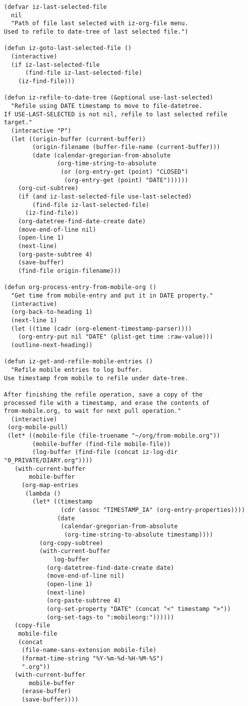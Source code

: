 \documentclass[nofonts]{tufte-handout}
\begin{document}
\begin{verbatim}
(defvar iz-last-selected-file
  nil
  "Path of file last selected with iz-org-file menu.
Used to refile to date-tree of last selected file.")

(defun iz-goto-last-selected-file ()
  (interactive)
  (if iz-last-selected-file
      (find-file iz-last-selected-file)
    (iz-find-file)))

(defun iz-refile-to-date-tree (&optional use-last-selected)
  "Refile using DATE timestamp to move to file-datetree.
If USE-LAST-SELECTED is not nil, refile to last selected refile target."
  (interactive "P")
  (let ((origin-buffer (current-buffer))
        (origin-filename (buffer-file-name (current-buffer)))
        (date (calendar-gregorian-from-absolute
               (org-time-string-to-absolute
                (or (org-entry-get (point) "CLOSED")
                 (org-entry-get (point) "DATE"))))))
    (org-cut-subtree)
    (if (and iz-last-selected-file use-last-selected)
        (find-file iz-last-selected-file)
      (iz-find-file))
    (org-datetree-find-date-create date)
    (move-end-of-line nil)
    (open-line 1)
    (next-line)
    (org-paste-subtree 4)
    (save-buffer)
    (find-file origin-filename)))

(defun org-process-entry-from-mobile-org ()
  "Get time from mobile-entry and put it in DATE property."
  (interactive)
  (org-back-to-heading 1)
  (next-line 1)
  (let ((time (cadr (org-element-timestamp-parser))))
    (org-entry-put nil "DATE" (plist-get time :raw-value)))
  (outline-next-heading))

(defun iz-get-and-refile-mobile-entries ()
  "Refile mobile entries to log buffer.
Use timestamp from mobile to refile under date-tree.

After finishing the refile operation, save a copy of the
processed file with a timestamp, and erase the contents of
from-mobile.org, to wait for next pull operation."
  (interactive)
 (org-mobile-pull)
 (let* ((mobile-file (file-truename "~/org/from-mobile.org"))
        (mobile-buffer (find-file mobile-file))
        (log-buffer (find-file (concat iz-log-dir "0_PRIVATE/DIARY.org"))))
   (with-current-buffer
       mobile-buffer
     (org-map-entries
      (lambda ()
        (let* ((timestamp
                (cdr (assoc "TIMESTAMP_IA" (org-entry-properties))))
               (date
                (calendar-gregorian-from-absolute
                 (org-time-string-to-absolute timestamp))))
          (org-copy-subtree)
          (with-current-buffer
              log-buffer
            (org-datetree-find-date-create date)
            (move-end-of-line nil)
            (open-line 1)
            (next-line)
            (org-paste-subtree 4)
            (org-set-property "DATE" (concat "<" timestamp ">"))
            (org-set-tags-to ":mobileorg:"))))))
   (copy-file
    mobile-file
    (concat
     (file-name-sans-extension mobile-file)
     (format-time-string "%Y-%m-%d-%H-%M-%S")
     ".org"))
   (with-current-buffer
       mobile-buffer
     (erase-buffer)
     (save-buffer))))


\end{verbatim}
\end{document}
